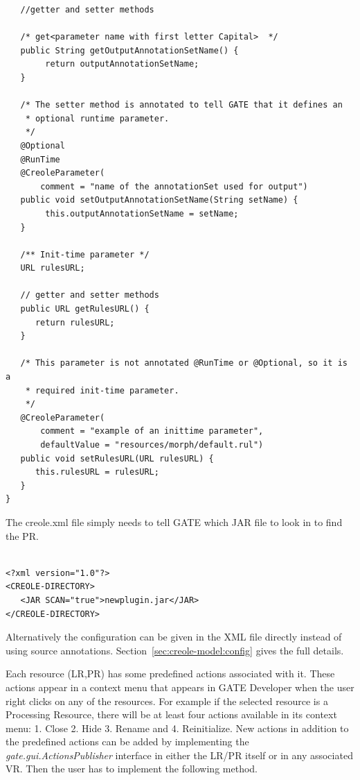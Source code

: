 \begin{lstlisting}
   //getter and setter methods

   /* get<parameter name with first letter Capital>  */
   public String getOutputAnnotationSetName() {
        return outputAnnotationSetName;
   }

   /* The setter method is annotated to tell GATE that it defines an
    * optional runtime parameter.
    */
   @Optional
   @RunTime
   @CreoleParameter(
       comment = "name of the annotationSet used for output")
   public void setOutputAnnotationSetName(String setName) {
        this.outputAnnotationSetName = setName;
   }

   /** Init-time parameter */
   URL rulesURL;

   // getter and setter methods
   public URL getRulesURL() {
      return rulesURL;
   }

   /* This parameter is not annotated @RunTime or @Optional, so it is a
    * required init-time parameter.
    */
   @CreoleParameter(
       comment = "example of an inittime parameter",
       defaultValue = "resources/morph/default.rul")
   public void setRulesURL(URL rulesURL) {
      this.rulesURL = rulesURL;
   }
}
\end{lstlisting}


The creole.xml file simply needs to tell GATE which JAR file to look in to find
the PR.

\begin{small}\begin{verbatim}

<?xml version="1.0"?>
<CREOLE-DIRECTORY>
   <JAR SCAN="true">newplugin.jar</JAR> 
</CREOLE-DIRECTORY>
\end{verbatim}\end{small}

Alternatively the configuration can be given in the XML file directly instead
of using source annotations.  Section~\ref{sec:creole-model:config} gives the
full details.


Each resource (LR,PR) has some predefined actions associated with
it. These actions appear in a context menu that appears in GATE
Developer when the user right clicks on any of the resources. For
example if the selected resource is a Processing Resource, there will
be at least four actions available in its context menu: 1. Close
2. Hide 3. Rename and 4. Reinitialize. New actions in
addition to the predefined actions can be added by implementing the
\textit{gate.gui.ActionsPublisher} interface in either the LR/PR itself or in
any associated VR. Then the user has to implement the
following method.

